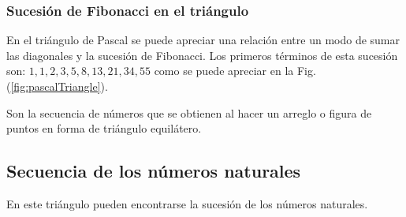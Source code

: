 \subsubsection{Sucesión de Fibonacci en el triángulo}
En el triángulo de Pascal se puede apreciar una relación entre un modo de sumar
las diagonales y la sucesión de Fibonacci. Los primeros términos de esta
sucesión son: $1,1,2,3,5,8,13,21,34,55$ como se puede apreciar en la Fig.
(\ref{fig:pascalTriangle}).
	
Son la secuencia de n\'umeros que se obtienen al hacer un arreglo o figura de
puntos en forma de tri\'angulo equil\'atero.

\begin{figure}[h!]
\end{figure}
	

\subsection*{Secuencia de los n\'umeros naturales}

En este tri\'angulo pueden encontrarse la sucesi\'on de los n\'umeros naturales.

\begin{figure}[h!]
\end{figure}
